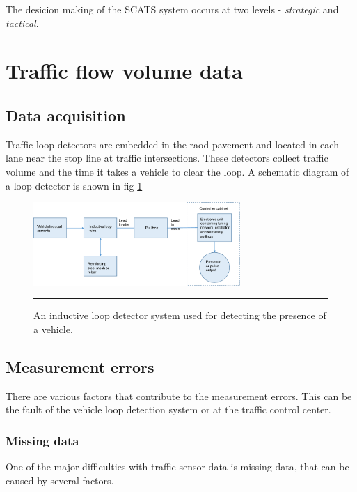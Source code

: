 The desicion making of the SCATS system occurs at two levels - \emph{strategic} and \emph{tactical}.


\section{Traffic flow volume data}


\subsection{Data acquisition}
Traffic loop detectors are embedded in the raod pavement and located in each lane near the stop
line at traffic intersections. These detectors collect traffic volume and the time it takes a
vehicle to clear the loop. A schematic diagram of a loop detector is shown in fig \ref{fig:loopDetector}

\begin{figure}[htbp]
  \centering
    \includegraphics[width=0.7\textwidth,height=0.7\textheight,keepaspectratio]{Figures/loop-detector.pdf}
    \rule{35em}{0.5pt}
  \caption[A vehicle loop detector system]{An inductive loop detector system used for detecting the presence
  of a vehicle.}
  \label{fig:loopDetector}
\end{figure}


\subsection{Measurement errors}
There are various factors that contribute to the measurement errors. This can be the fault of the
vehicle loop detection system or at the traffic control center.

\subsubsection{Missing data}
One of the major difficulties with traffic sensor data is missing data, that can be caused by
several factors.



